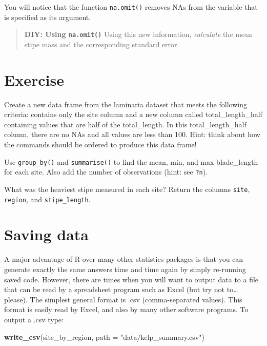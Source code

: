 \documentclass[
]{book}
\newenvironment{Shaded}{\begin{snugshade}}{\end{snugshade}}
\newcommand{\DataTypeTok}[1]{\textcolor[rgb]{0.13,0.29,0.53}{#1}}
\newcommand{\KeywordTok}[1]{\textcolor[rgb]{0.13,0.29,0.53}{\textbf{#1}}}
\newcommand{\NormalTok}[1]{#1}
\newcommand{\StringTok}[1]{\textcolor[rgb]{0.31,0.60,0.02}{#1}}
\begin{document}
You will notice that the function \texttt{na.omit()} removes NAs from the variable that is specified as its argument.

\begin{quote}
\textbf{DIY: Using \texttt{na.omit()}}
Using this new information, \emph{calculate} the mean stipe mass and the corresponding standard error.
\end{quote}

\hypertarget{exercise-2}{%
\section{Exercise}\label{exercise-2}}

Create a new data frame from the laminaria dataset that meets the following criteria: contains only the site column and a new column called total\_length\_half containing values that are half of the total\_length. In this total\_length\_half column, there are no NAs and all values are less than 100. Hint: think about how the commands should be ordered to produce this data frame!

Use \texttt{group\_by()} and \texttt{summarise()} to find the mean, min, and max blade\_length for each site. Also add the number of observations (hint: see \texttt{?n}).

What was the heaviest stipe measured in each site? Return the columns \texttt{site}, \texttt{region}, and \texttt{stipe\_length}.

\hypertarget{saving-data}{%
\section{Saving data}\label{saving-data}}

A major advantage of R over many other statistics packages is that you can generate exactly the same answers time and time again by simply re-running saved code. However, there are times when you will want to output data to a file that can be read by a spreadsheet program such as Excel (but try not to\ldots{} please). The simplest general format is .csv (comma-separated values). This format is easily read by Excel, and also by many other software programs. To output a .csv type:

\begin{Shaded}
\begin{Highlighting}[]
\KeywordTok{write\_csv}\NormalTok{(site\_by\_region, }\DataTypeTok{path =} \StringTok{"data/kelp\_summary.csv"}\NormalTok{)}
\end{Highlighting}
\end{Shaded}
\end{document}
